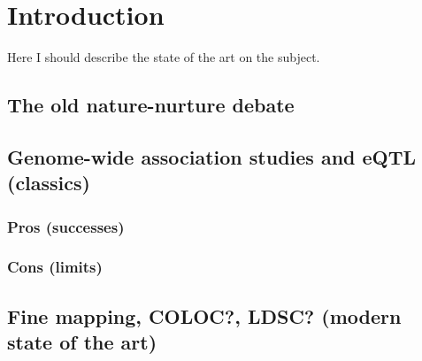 \documentclass[../main.tex]{subfiles}
\begin{document}
\chapter{Introduction}

Here I should describe the state of the art on the subject.

\section{The old nature-nurture debate}


\section{Genome-wide association studies and eQTL (classics)}

\subsection{Pros (successes)}

\subsection{Cons (limits)}

\section{Fine mapping, COLOC?, LDSC? (modern state of the art)}






\end{document}
